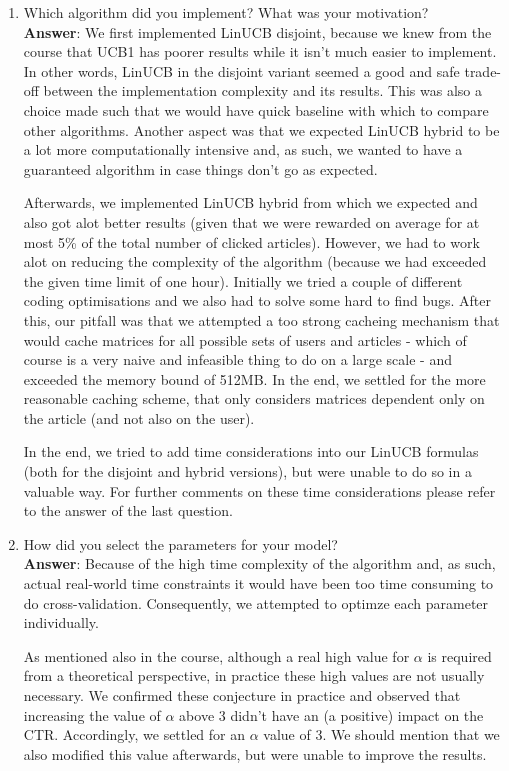 \documentclass[11pt]{article}
\begin{document}
\begin{enumerate}
\item Which algorithm did you implement? What was your motivation? \\
\textbf{Answer}:
We first implemented LinUCB disjoint, because we knew from the course that UCB1
has poorer results while it isn't much easier to implement. In other words,
LinUCB in the disjoint variant seemed a good and safe trade-off between the
implementation complexity and its results. This was also a choice made such
that we would have quick baseline with which to compare other algorithms.
Another aspect was that we expected LinUCB hybrid to be a lot more
computationally intensive and, as such, we wanted to have a guaranteed
algorithm in case things don't go as expected.

Afterwards, we implemented LinUCB hybrid from which we expected and also got
alot better results (given that we were rewarded on average for at most 5\% of
the total number of clicked articles). However, we had to work alot on reducing
the complexity of the algorithm (because we had exceeded the given time limit of
one hour). Initially we tried a couple of different coding optimisations and we
also had to solve some hard to find bugs. After this, our pitfall was that we
attempted a too strong cacheing mechanism that would cache matrices for all
possible sets of users and articles - which of course is a very naive and infeasible
thing to do on a large scale - and exceeded the memory bound of 512MB. In the
end, we settled for the more reasonable caching scheme, that only considers
matrices dependent only on the article (and not also on the user).

In the end, we tried to add time considerations into our LinUCB formulas (both
for the disjoint and hybrid versions), but were unable to do so in a valuable
 way. For further comments on these time considerations please refer to the
 answer of the last question.

\item How did you select the parameters for your model? \\
\textbf{Answer}:
Because of the high time complexity of the algorithm and, as such, actual
real-world time constraints it would have been too time consuming to do
cross-validation. Consequently, we attempted to optimze each parameter
individually.

As mentioned also in the course, although a real high value for $\alpha$ is
required from a theoretical perspective, in practice these high values are not
usually necessary. We confirmed these conjecture in practice and observed that
increasing the value of $\alpha$ above 3 didn't have an (a positive) impact on
the CTR. Accordingly, we settled for an $\alpha$ value of 3. We should mention
that we also modified this value afterwards, but were unable to improve the
results.


\end{enumerate}
\end{document}
